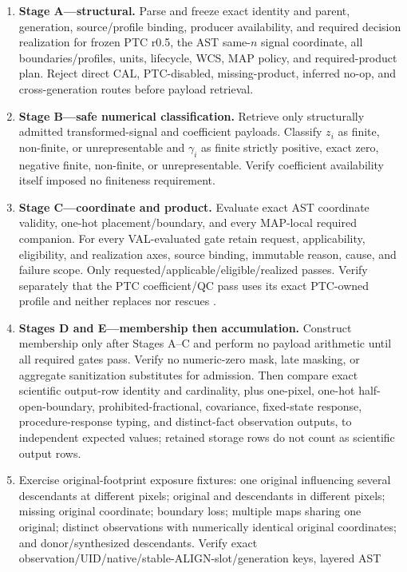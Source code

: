\documentclass[10pt]{article}
\begin{document}
\begin{enumerate}
\item \textbf{Stage A---structural.} Parse and freeze exact identity and
parent, generation, source/profile binding, producer availability, and
required decision realization for frozen PTC r0.5, the AST same-\(n\) signal
coordinate, all boundaries/profiles, units, lifecycle, WCS, MAP policy, and
required-product plan. Reject direct CAL, PTC-disabled, missing-product,
inferred no-op, and cross-generation routes before payload retrieval.
\item \textbf{Stage B---safe numerical classification.} Retrieve only
structurally admitted transformed-signal and coefficient payloads. Classify
\(z_i\) as finite, non-finite, or unrepresentable and \(\gamma_i\) as finite
strictly positive, exact zero, negative finite, non-finite, or
unrepresentable. Verify coefficient availability itself imposed no finiteness
requirement.
\item \textbf{Stage C---coordinate and product.} Evaluate exact AST coordinate
validity, one-hot placement/boundary, and every MAP-local required companion.
For every VAL-evaluated gate retain request, applicability, eligibility, and
realization axes, source binding, immutable reason, cause, and failure scope.
Only requested/applicable/eligible/realized passes. Verify separately that the
PTC coefficient/QC pass uses its exact PTC-owned profile and neither replaces
nor rescues \SCIMapUpstreamProfile.
\item \textbf{Stages D and E---membership then accumulation.} Construct
membership only after Stages A--C and perform no payload arithmetic until all
required gates pass. Verify no numeric-zero mask, late masking, or aggregate
sanitization substitutes for admission. Then compare exact scientific
output-row identity and cardinality, plus
one-pixel, one-hot half-open-boundary, prohibited-fractional, covariance,
fixed-state response, procedure-response typing, and distinct-fact
observation outputs, to independent expected values; retained storage rows do
not count as scientific output rows.
\item Exercise original-footprint exposure fixtures: one original influencing
several descendants at different pixels; original and descendants in
different pixels; missing original coordinate; boundary loss; multiple maps
sharing one original; distinct observations with numerically identical
original coordinates; and donor/synthesized descendants. Verify exact
observation/UID/native/stable-ALIGN-slot/generation keys, layered AST

\end{enumerate}
\end{document}
